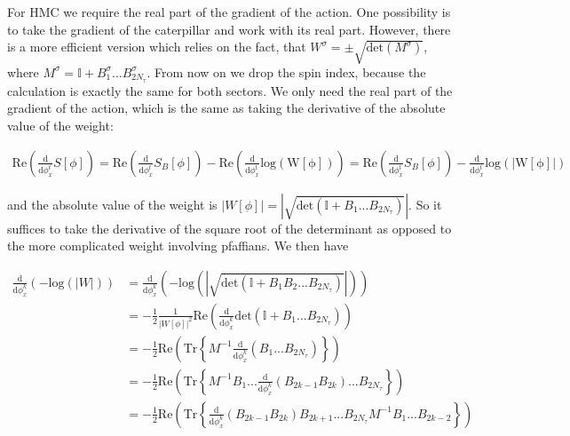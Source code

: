 \documentclass{article}
\begin{document}
For HMC we require the real part of the gradient of the action. One possibility is to take the gradient of the caterpillar and work with its real part. However, there is a more efficient version which relies on the fact, that $W^{\sigma}  = \pm \sqrt{\mathrm{det}\left(  M^{\sigma}  \right)}$, where $M^{\sigma}  = \mathbb{I} + B^{\sigma} _1 ... B^{\sigma} _{2N_{\tau} }$. From now on we drop the spin index, because the calculation is exactly the same for both sectors. We only need the real part of the gradient of the action, which is the same as taking the derivative of the absolute value of the weight:

\begin{align}
	\mathrm{Re} \left(\frac{\mathrm{d} }{\mathrm{d}\phi_{x}^{t} } S[\phi] \right) = \mathrm{Re} \left(\frac{\mathrm{d} }{\mathrm{d}\phi_{x}^{t} }  S_B[\phi] \right) - \mathrm{Re} \left(\frac{\mathrm{d} }{\mathrm{d}\phi_{x}^{t} }\mathrm{log\left(W[\phi]\right) }  \right)  = \mathrm{Re} \left(\frac{\mathrm{d} }{\mathrm{d}\phi_{x}^{t} }  S_B[\phi] \right) - \frac{\mathrm{d} }{\mathrm{d}\phi_{x}^{t} }\mathrm{log\left(|W[\phi]|\right) }   
\end{align}

and the absolute value of the weight is $|W[\phi]| = \left|\sqrt{\mathrm{det} \left(\mathbb{I} + B_1 ... B_{2N_\tau} \right) }\right|$. So it suffices to take the derivative of the square root of the determinant as opposed to the more complicated weight involving pfaffians. We then have

\begin{align}
	\frac{\mathrm{d} }{\mathrm{d}\phi_{x}^{k} } \left(-\mathrm{log}\left(|W|\right) \right) &= 
	\frac{\mathrm{d} }{\mathrm{d}\phi_{x}^{k} } \left(- \mathrm{log} \left(|\sqrt{\mathrm{det} \left(\mathbb{I} + B_1B_2...B_{2N_\tau} \right) }|\right) \right)\\  
	&= -\frac{1}{2}\frac{1}{|W[\phi]|^{2} }\mathrm{Re}\left(   \frac{\mathrm{d} }{\mathrm{d}\phi_{x}^{k}} \mathrm{det}\left(\mathbb{I} + B_1...B_{2N_\tau}\right)\right) \\
	&= -\frac{1}{2} \mathrm{Re} \left( \mathrm{Tr} \left\{M^{-1}\frac{\mathrm{d} }{\mathrm{d}\phi_{x}^{k}}\left(B_1...B_{2N_\tau}\right)  \right\}\right)\\
	&= -\frac{1}{2}\mathrm{Re} \left(\mathrm{Tr} \left\{M^{-1}B_{1}...\frac{\mathrm{d} }{\mathrm{d}\phi_{x}^{k}}\left(B_{2k-1}B_{2k}\right)...B_{2N_\tau}   \right\} \right)\\
	&=    -\frac{1}{2}\mathrm{Re} \left(\mathrm{Tr} \left\{\frac{\mathrm{d} }{\mathrm{d}\phi_{x}^{k}}\left(B_{2k-1}B_{2k}\right)B_{2k+1} ...B_{2N_\tau}M^{-1}B_{1}...B_{2k-2}    \right\} \right)
\end{align}
\end{document}

